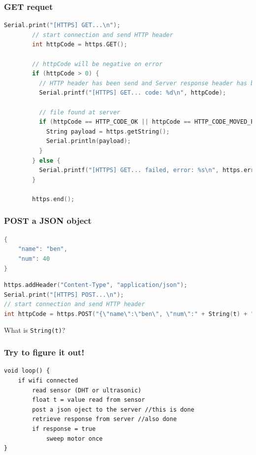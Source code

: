 \documentclass[compress, aspectratio=32]{beamer}
\begin{document}
\begin{frame}[fragile]
    \frametitle{GET requet}
    \begin{lstlisting}[language=c, firstnumber=55, basicstyle=\ttfamily\tiny]
        Serial.print("[HTTPS] GET...\n");
        // start connection and send HTTP header
        int httpCode = https.GET();
  
        // httpCode will be negative on error
        if (httpCode > 0) {
          // HTTP header has been send and Server response header has been handled
          Serial.printf("[HTTPS] GET... code: %d\n", httpCode);
  
          // file found at server
          if (httpCode == HTTP_CODE_OK || httpCode == HTTP_CODE_MOVED_PERMANENTLY) {
            String payload = https.getString();
            Serial.println(payload);
          }
        } else {
          Serial.printf("[HTTPS] GET... failed, error: %s\n", https.errorToString(httpCode).c_str());
        }
  
        https.end();
    \end{lstlisting}
\end{frame}

\begin{frame}[fragile]
    \frametitle{POST a JSON object}
    \begin{lstlisting}[language=c,numbers=none]
{
    "name": "ben",
    "num": 40
}
    \end{lstlisting}
    \begin{lstlisting}[language=c, numbers=none]
https.addHeader("Content-Type", "application/json");
Serial.print("[HTTPS] POST...\n");
// start connection and send HTTP header
int httpCode = https.POST("{\"name\":\"ben\", \"num\":" + String(t) + "}");
    \end{lstlisting}
    What is \verb|String(t)|?
\end{frame}

\begin{frame}[fragile]
    \frametitle{Try to figure it out!}
    \begin{lstlisting}[numbers=none, caption={Pseudo code}]
void loop() {
    if wifi connected
        read sensor (DHT or ultrasonic)
        float t = value read from sensor
        post a json oject to the server //this is done
        retrieve response from server //also done
        if response = true
            sweep motor once
}
    \end{lstlisting}
\end{frame}
\end{document}
